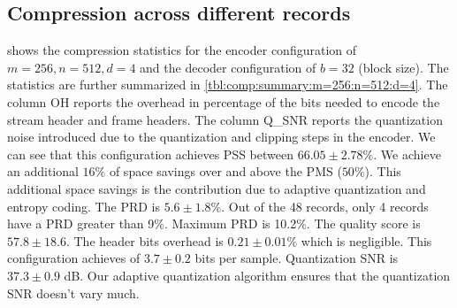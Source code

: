\subsection{Compression across different records}

shows the compression statistics for the
encoder configuration of $m=256,n=512,d=4$
and the decoder configuration of $b=32$ (block size).
The statistics are further summarized in
\cref{tbl:comp:summary:m=256:n=512:d=4}.
The column OH reports the overhead in percentage
of the bits needed to encode the stream header
and frame headers. The column Q\_SNR reports the
quantization noise introduced due to the quantization
and clipping steps in the encoder.
We can see that this configuration achieves
PSS between $66.05 \pm 2.78$\%.
We achieve an additional $16\%$ of space savings
over and above the PMS ($50\%$).
This additional space savings is the contribution
due to adaptive quantization and entropy coding.
The PRD is $5.6 \pm 1.8 \%$.
Out of the 48 records, only 4 records have a PRD
greater than 9\%. Maximum PRD is 10.2\%.
The quality score is $57.8 \pm 18.6$.
The header bits overhead is $0.21 \pm 0.01 \%$
which is negligible.
This configuration achieves of $3.7 \pm 0.2$ bits per sample.
Quantization SNR is $37.3 \pm 0.9$ dB.
Our adaptive quantization algorithm ensures that the
quantization SNR doesn't vary much.




